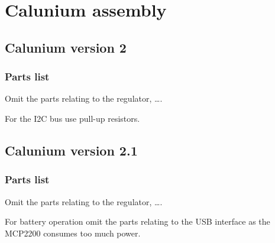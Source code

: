 \chapter{Calunium assembly}

\section{Calunium version 2}

\subsection{Parts list}

Omit the parts relating to the  regulator, \ldots.

For the I2C bus use  pull-up resistors.

\section{Calunium version 2.1}

\subsection{Parts list}

Omit the parts relating to the  regulator, \ldots.

For battery operation omit the parts relating to the USB interface as
the MCP2200 consumes too much power.
